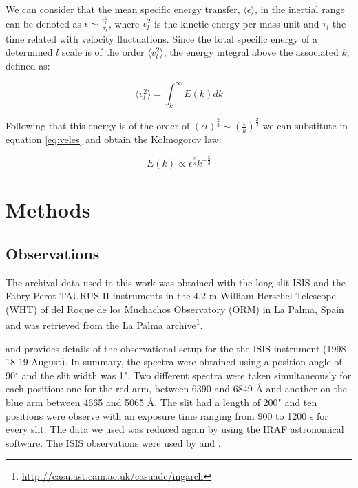 \documentclass[fleqn,usenatbib]{mnras}
\begin{document}
We can consider that  the mean specific energy transfer, $\langle \epsilon \rangle$, in the inertial range can be denoted as $\epsilon \sim \frac{v_{l}^{2}}{\tau_{l}}$, where $v_{l}^{2}$ is the kinetic energy per mass unit and $\tau_{l}$ the time related with velocity fluctuations. Since the total specific energy of a determined $l$ scale is of the order $\langle v_{l}^{2} \rangle$, the energy integral above the associated $k$, defined as:

\begin{equation}\label{eq:veles}
 \langle v_{l}^{2} \rangle = \int_{k}^{\infty} E(k)dk
\end{equation}

Following that this energy is of the order of $(\epsilon l)^{\frac{2}{3}} \sim (\frac{\epsilon}{k})^{\frac{2}{3}}$ we can substitute in equation \ref{eq:veles} and obtain the Kolmogorov law:

\begin{equation}\label{eq:kolm}
E(k) \propto \epsilon^\frac{2}{3} k^{-\frac{5}{3}}
\end{equation}



\section{Methods}\label{sec:met}

\subsection{Observations}\label{sec:obs}

The archival data used in this work was obtained with the long-slit ISIS and the Fabry Perot TAURUS-II instruments in the 4.2-m William Herschel Telescope (WHT) of del Roque de los Muchachos Observatory (ORM) in La Palma, Spain and was retrieved from the La Palma archive\footnote{\url{http://casu.ast.cam.ac.uk/casuadc/ingarch}}.

\citet{2000PASP..112.1138M} and \citep{maiz2004} provides details of the observational setup for the the ISIS instrument (1998 18-19 August). In summary, the spectra were obtained  using a position angle of 90$^{\circ}$ and the slit width was 1". Two different spectra were taken simultaneously for each position: one for the red arm, between 6390 and 6849 \r{A} and another on the blue arm between 4665 and 5065 \r{A}. The slit had a length of 200" and ten  positions  were observe with an exposure time ranging from 900 to 1200 s for every slit. The  data we used was reduced again by \citet{jen2013} using the IRAF \citep{1999ascl.soft11002N} astronomical software. The ISIS observations were used by \citet{TT2000} and \citet{maiz2004}.  
\end{document}

